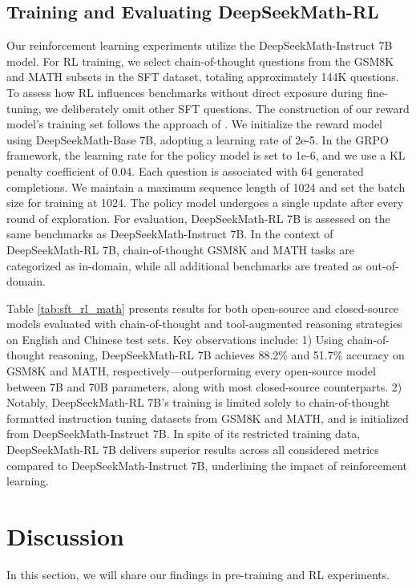 \begin{itemize}[topsep=0pt]
\begin{itemize}[topsep=0pt]
\subsection{Training and Evaluating DeepSeekMath-RL}

Our reinforcement learning experiments utilize the DeepSeekMath-Instruct 7B model. For RL training, we select chain-of-thought questions from the GSM8K and MATH subsets in the SFT dataset, totaling approximately 144K questions. To assess how RL influences benchmarks without direct exposure during fine-tuning, we deliberately omit other SFT questions. The construction of our reward model’s training set follows the approach of \citep{wang2023math}. We initialize the reward model using DeepSeekMath-Base 7B, adopting a learning rate of 2e-5. In the GRPO framework, the learning rate for the policy model is set to 1e-6, and we use a KL penalty coefficient of 0.04. Each question is associated with $64$ generated completions. We maintain a maximum sequence length of 1024 and set the batch size for training at 1024. The policy model undergoes a single update after every round of exploration. For evaluation, DeepSeekMath-RL 7B is assessed on the same benchmarks as DeepSeekMath-Instruct 7B. In the context of DeepSeekMath-RL 7B, chain-of-thought GSM8K and MATH tasks are categorized as in-domain, while all additional benchmarks are treated as out-of-domain.

Table \ref{tab:sft_rl_math} presents results for both open-source and closed-source models evaluated with chain-of-thought and tool-augmented reasoning strategies on English and Chinese test sets. Key observations include: 1) Using chain-of-thought reasoning, DeepSeekMath-RL 7B achieves 88.2\% and 51.7\% accuracy on GSM8K and MATH, respectively—outperforming every open-source model between 7B and 70B parameters, along with most closed-source counterparts. 2) Notably, DeepSeekMath-RL 7B's training is limited solely to chain-of-thought formatted instruction tuning datasets from GSM8K and MATH, and is initialized from DeepSeekMath-Instruct 7B. In spite of its restricted training data, DeepSeekMath-RL 7B delivers superior results across all considered metrics compared to DeepSeekMath-Instruct 7B, underlining the impact of reinforcement learning.

\section{Discussion}
In this section, we will share our findings in pre-training and RL experiments. 


\end{itemize}
\end{itemize}
